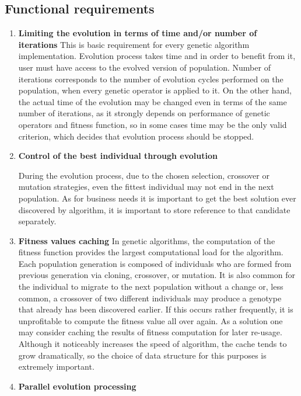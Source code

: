 \subsection{Functional requirements}
\begin{enumerate}
\item \label{freq:stop} \textbf{Limiting the evolution in terms of time and/or number of iterations}
This is basic requirement for every genetic algorithm implementation. Evolution process takes time and in order to benefit from it, user must have access to the evolved version of population. Number of iterations corresponds to the number of evolution cycles performed on the population, when every genetic operator is applied to it. On the other hand, the actual time of the evolution may be changed even in terms of the same number of iterations, as it strongly depends on performance of genetic operators and fitness function, so in some cases time may be the only valid criterion, which decides that evolution process should be stopped. 
\medbreak

\item \label{freq:best} \textbf{Control of the best individual through evolution}

During the evolution process, due to the chosen selection, crossover or mutation strategies, even the fittest individual may not end in the next population. As for business needs it is important to get the best solution ever discovered by algorithm, it is important to store reference to that candidate separately.
\medbreak

\item \label{freq:cache} \textbf{Fitness values caching}
In genetic algorithms, the computation of the fitness function provides the largest computational load for the algorithm. Each population generation is composed of individuals who are formed from previous generation via cloning, crossover, or mutation. It is also common for the individual to migrate to the next population without a change or, less common, a crossover of two different individuals may produce a genotype that already has been discovered earlier. If this occurs rather frequently, it is unprofitable to compute the fitness value all over again. As a solution one may consider caching the results of fitness computation for later re-usage. Although it noticeably increases the speed of algorithm, the cache tends to grow dramatically, so the choice of data structure for this purposes is extremely important. 
\medbreak

\item \label{freq:par} \textbf{Parallel evolution processing}


\end{enumerate}
